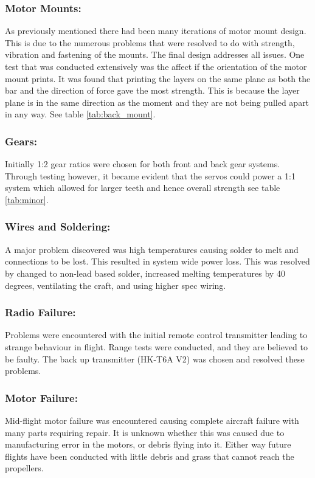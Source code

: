 \subsubsection*{Motor Mounts:} As previously mentioned there had been many iterations of motor mount design. This is due to the numerous problems that were resolved to do with strength, vibration and fastening of the mounts. The final design addresses all issues. One test that was conducted extensively was the affect if the orientation of the motor mount prints. It was found that printing the layers on the same plane as both the bar and the direction of force gave the most strength. This is because the layer plane is in the same direction as the moment and they are not being pulled apart in any way. See table \ref{tab:back_mount}.

\subsubsection*{Gears:} Initially 1:2 gear ratios were chosen for both front and back gear systems. Through testing however, it became evident that the servos could power a 1:1 system which allowed for larger teeth and hence overall strength see table \ref{tab:minor}.

\subsubsection*{Wires and Soldering:}  A major problem discovered was high temperatures causing solder to melt and connections to be lost. This resulted in system wide power loss. This was resolved by changed to non-lead based solder, increased melting temperatures by 40 degrees, ventilating the craft, and using higher spec wiring. 

\subsubsection*{Radio Failure:} Problems were encountered with the initial remote control  transmitter leading to strange behaviour in flight. Range tests were conducted, and they are believed to be faulty. The back up transmitter (HK-T6A V2) was chosen and resolved these problems.

\subsubsection*{Motor Failure:} Mid-flight motor failure was encountered causing complete aircraft failure with many parts requiring repair. It is unknown whether this was caused due to manufacturing error in the motors, or debris flying into it. Either way future flights have been conducted with little debris and grass that cannot reach the propellers. 

